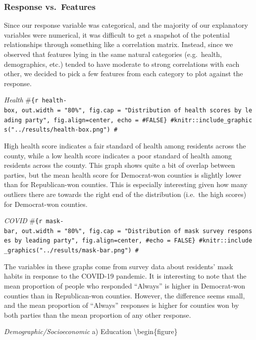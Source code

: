 \documentclass[
]{article}
\begin{document}
\hypertarget{response-vs.-features}{%
\subsubsection{Response vs.~Features}\label{response-vs.-features}}

Since our response variable was categorical, and the majority of our explanatory variables were numerical, it was difficult to get a snapshot of the potential relationships through something like a correlation matrix. Instead, since we observed that features lying in the same natural categories (e.g.~health, demographics, etc.) tended to have moderate to strong correlations with each other, we decided to pick a few features from each category to plot against the response.

\emph{Health}
\#\texttt{\{r\ health-box,\ out.width\ =\ "80\%",\ fig.cap\ =\ "Distribution\ of\ health\ scores\ by\ leading\ party",\ fig.align=\textquotesingle{}center\textquotesingle{},\ echo\ =\ \#FALSE\}\ \#knitr::include\_graphics("../results/health-box.png")\ \#}

High health score indicates a fair standard of health among residents across the county, while a low health score indicates a poor standard of health among residents across the county. This graph shows quite a bit of overlap between parties, but the mean health score for Democrat-won counties is slightly lower than for Republican-won counties. This is especially interesting given how many outliers there are towards the right end of the distribution (i.e.~the high scores) for Democrat-won counties.

\emph{COVID}
\#\texttt{\{r\ mask-bar,\ out.width\ =\ "80\%",\ fig.cap\ =\ "Distribution\ of\ mask\ survey\ responses\ by\ leading\ party",\ fig.align=\textquotesingle{}center\textquotesingle{},\ \#echo\ =\ FALSE\}\ \#knitr::include\_graphics("../results/mask-bar.png")\ \#}

The variables in these graphs come from survey data about residents' mask habits in response to the COVID-19 pandemic. It is interesting to note that the mean proportion of people who responded ``Always'' is higher in Democrat-won counties than in Republican-won counties. However, the difference seems small, and the mean proportion of ``Always'' responses is higher for counties won by both parties than the mean proportion of any other response.

\emph{Demographic/Socioeconomic}
a) Education
\textbackslash begin\{figure\}
\end{document}
